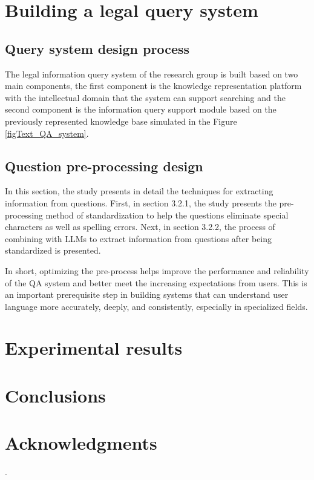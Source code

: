 \documentclass{IOS-Book-Article}
\begin{document}
\section{Building a legal query system}
\label{sec:SummaryQ}

\subsection{Query system design process}

The legal information query system of the research group is built based on two main components, the first component is the knowledge representation platform with the intellectual domain that the system can support searching and the second component is the information query support module based on the previously represented knowledge base simulated in the Figure \ref{figText_QA_system}.


\subsection{Question pre-processing design}

In this section, the study presents in detail the techniques for extracting information from questions. First, in section 3.2.1, the study presents the pre-processing method of standardization to help the questions eliminate special characters as well as spelling errors. Next, in section 3.2.2, the process of combining with LLMs to extract information from questions after being standardized is presented.

In short, optimizing the pre-process helps improve the performance and reliability of the QA system and better meet the increasing expectations from users. This is an important prerequisite step in building systems that can understand user language more accurately, deeply, and consistently, especially in specialized fields.

\section{Experimental results}
\label{sec:Exp}



\section{Conclusions}
\label{sec:concl}


\section*{Acknowledgments}
.


\end{document}
